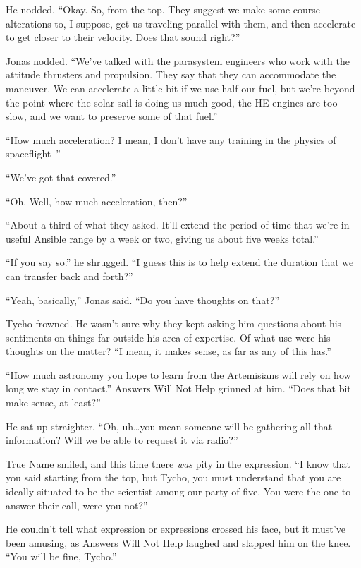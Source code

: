 He nodded. ``Okay. So, from the top. They suggest we make some course alterations to, I suppose, get us traveling parallel with them, and then accelerate to get closer to their velocity. Does that sound right?''

Jonas nodded. ``We've talked with the parasystem engineers who work with the attitude thrusters and propulsion. They say that they can accommodate the maneuver. We can accelerate a little bit if we use half our fuel, but we're beyond the point where the solar sail is doing us much good, the HE engines are too slow, and we want to preserve some of that fuel.''

``How much acceleration? I mean, I don't have any training in the physics of spaceflight--''

``We've got that covered.''

``Oh. Well, how much acceleration, then?''

``About a third of what they asked. It'll extend the period of time that we're in useful Ansible range by a week or two, giving us about five weeks total.''

``If you say so.'' he shrugged. ``I guess this is to help extend the duration that we can transfer back and forth?''

``Yeah, basically,'' Jonas said. ``Do you have thoughts on that?''

Tycho frowned. He wasn't sure why they kept asking him questions about his sentiments on things far outside his area of expertise. Of what use were his thoughts on the matter? ``I mean, it makes sense, as far as any of this has.''

``How much astronomy you hope to learn from the Artemisians will rely on how long we stay in contact.'' Answers Will Not Help grinned at him. ``Does that bit make sense, at least?''

He sat up straighter. ``Oh, uh\ldots you mean someone will be gathering all that information? Will we be able to request it via radio?''

True Name smiled, and this time there \emph{was} pity in the expression. ``I know that you said starting from the top, but Tycho, you must understand that you are ideally situated to be the scientist among our party of five. You were the one to answer their call, were you not?''

He couldn't tell what expression or expressions crossed his face, but it must've been amusing, as Answers Will Not Help laughed and slapped him on the knee. ``You will be fine, Tycho.''

